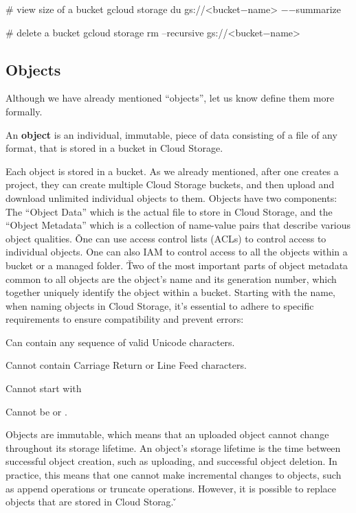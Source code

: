 \begin{bash}
# view size of a bucket
gcloud storage du gs://<bucket$-$name> $-$$-$summarize
\end{bash}

\begin{bash}
# delete a bucket
gcloud storage rm --recursive gs://<bucket$-$name>
\end{bash}

\subsection{Objects}

Although we have already mentioned ``objects'', let us know define them more formally.

\bd[Object]
An \textbf{object} is an individual, immutable, piece of data consisting of a file of any format, that is stored in a
bucket in Cloud Storage.
\ed

Each object is stored in a bucket. As we already mentioned, after one creates a project, they can create multiple Cloud
Storage buckets, and then upload and download unlimited individual objects to them. Objects have two components: The
``Object Data'' which is the actual file to store in Cloud Storage, and the ``Object Metadata'' which is a collection of
name-value pairs that describe various object qualities. \v

One can use access control lists (ACLs) to control access to individual objects. One can also IAM to control access to
all the objects within a bucket or a managed folder. \v

Two of the most important parts of object metadata common to all objects are the object's name and its generation number,
which together uniquely identify the object within a bucket. Starting with the name, when naming objects in Cloud Storage,
it's essential to adhere to specific requirements to ensure compatibility and prevent errors:
\bit
\item Can contain any sequence of valid Unicode characters.
\item Cannot contain Carriage Return or Line Feed characters.
\item Cannot start with 
\item Cannot be  or .
\eit

Objects are immutable, which means that an uploaded object cannot change throughout its storage lifetime. An
object's storage lifetime is the time between successful object creation, such as uploading, and successful object
deletion. In practice, this means that one cannot make incremental changes to objects, such as append operations or
truncate operations. However, it is possible to replace objects that are stored in Cloud Storag. \v

